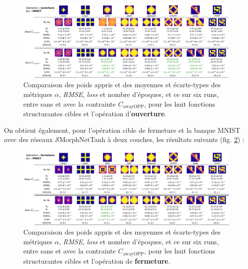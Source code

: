 \vspace{1.0mm}
\begin{figure}[!htp]
  \begin{center}
  
    \includegraphics[width=1.00\linewidth]{parts/3-contributions/C-contraintes_geometriques/figures/f_opening_mnist.pdf}
    \vspace{-4.0mm}
    \caption{ \centering Comparaison des poids appris et des moyennes et écarts-types des métriques $\alpha$, \textit{RMSE}, \textit{loss} et nombre d'époques, et ce sur six runs, entre sans et avec la contrainte $C_\text{awayOPP}$, pour les huit fonctions structurantes cibles et l'opération d'\textbf{ouverture}.}
    \label{fig:MSEpFSIMvsMSEpFSIMpASIM_opening}
    
  \end{center}
\end{figure}


\newpage

On obtient également, pour l'opération cible de fermeture et la banque MNIST avec des réseaux $\mathcal{S}$MorphNetTanh à deux couches, les résultats suivants (fig. \ref{fig:MSEpFSIMvsMSEpFSIMpASIM_closing}) : \\

\vspace{1.6mm}
\begin{figure}[!htp]
  \begin{center}
  
    \includegraphics[width=1.00\linewidth]{parts/3-contributions/C-contraintes_geometriques/figures/f_closing_mnist.pdf}
    \vspace{-4.0mm}
    \caption{ \centering Comparaison des poids appris et des moyennes et écarts-types des métriques $\alpha$, \textit{RMSE}, \textit{loss} et nombre d'époques, et ce sur six runs, entre sans et avec la contrainte $C_\text{awayOPP}$, pour les huit fonctions structurantes cibles et l'opération de \textbf{fermeture}.}
    \label{fig:MSEpFSIMvsMSEpFSIMpASIM_closing}
    
  \end{center}
\end{figure}


